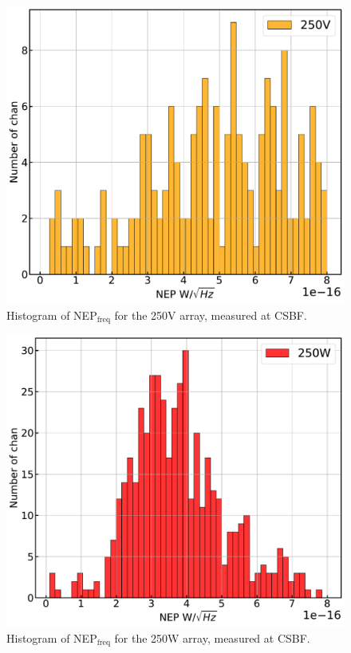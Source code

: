 \begin{figure}[!htbp]
\centering
\includegraphics[width=\textwidth]{figures/blast_data/hist/PAL_NEP_hist_R2}
\caption[~Histogram of  for the 250V array, measured at CSBF.]{Histogram of NEP$_{\mathrm{freq}}$ for the 250V array, measured at CSBF.}
\label{fig:pal nep 250V}

\end{figure}
\begin{figure}[!htbp]
\centering
\includegraphics[width=\textwidth]{figures/blast_data/hist/PAL_NEP_hist_R5}
\caption[~Histogram of  for the 250W array, measured at CSBF.]{Histogram of NEP$_{\mathrm{freq}}$ for the 250W array, measured at CSBF.}
\label{fig:pal nep 250W}
\end{figure}

